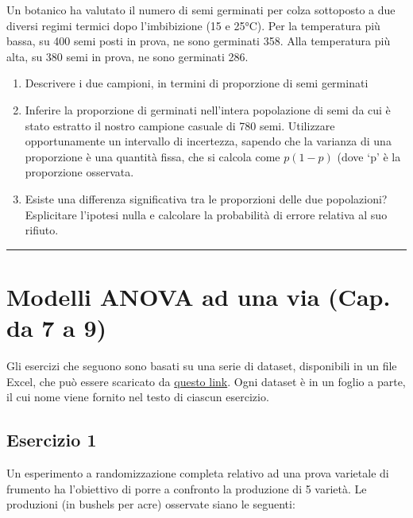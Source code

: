 \documentclass[a4paper,12pt,oneside]{book}
\providecommand{\tightlist}{%
  \setlength{\itemsep}{0pt}\setlength{\parskip}{0pt}}
\begin{document}
Un botanico ha valutato il numero di semi germinati per colza sottoposto a due diversi regimi termici dopo l'imbibizione (15 e 25°C). Per la temperatura più bassa, su 400 semi posti in prova, ne sono germinati 358. Alla temperatura più alta, su 380 semi in prova, ne sono germinati 286.

\begin{enumerate}
\def\labelenumi{\arabic{enumi}.}
\tightlist
\item
  Descrivere i due campioni, in termini di proporzione di semi germinati
\item
  Inferire la proporzione di germinati nell'intera popolazione di semi da cui è stato estratto il nostro campione casuale di 780 semi. Utilizzare opportunamente un intervallo di incertezza, sapendo che la varianza di una proporzione è una quantità fissa, che si calcola come \(p ( 1- p)\) (dove `p' è la proporzione osservata.
\item
  Esiste una differenza significativa tra le proporzioni delle due popolazioni? Esplicitare l'ipotesi nulla e calcolare la probabilità di errore relativa al suo rifiuto.
\end{enumerate}

\begin{center}\rule{0.5\linewidth}{0.5pt}\end{center}

\hypertarget{modelli-anova-ad-una-via-cap.-da-7-a-9}{%
\section{Modelli ANOVA ad una via (Cap. da 7 a 9)}\label{modelli-anova-ad-una-via-cap.-da-7-a-9}}

Gli esercizi che seguono sono basati su una serie di dataset, disponibili in un file Excel, che può essere scaricato da \href{https://www.casaonofri.it/_datasets/EserciziTesto.xlsx}{questo link}. Ogni dataset è in un foglio a parte, il cui nome viene fornito nel testo di ciascun esercizio.

\hypertarget{esercizio-1-5}{%
\subsection{Esercizio 1}\label{esercizio-1-5}}

Un esperimento a randomizzazione completa relativo ad una prova varietale di frumento ha l'obiettivo di porre a confronto la produzione di 5 varietà. Le produzioni (in bushels per acre) osservate siano le seguenti:
\end{document}

